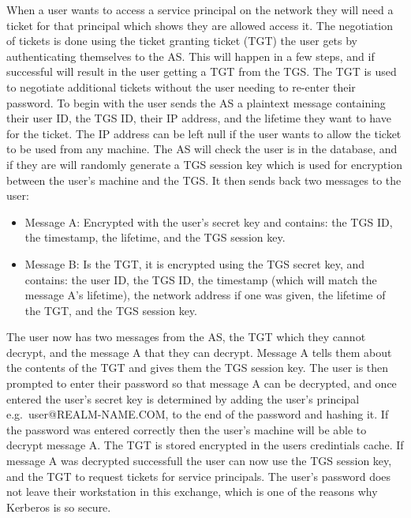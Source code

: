 \documentclass[]{report}   %
\begin{document}
When a user wants to access a service principal on the network they will need a ticket for that principal which shows they are allowed access it. The negotiation of tickets is done using the ticket granting ticket (TGT) the user gets by authenticating themselves to the AS. This will happen in a few steps, and if successful will result in the user getting a TGT from the TGS. The TGT is used to negotiate additional tickets without the user needing to re-enter their password. To begin with the user sends the AS a plaintext message containing their user ID, the TGS ID, their IP address, and the lifetime they want to have for the ticket. The IP address can be left null if the user wants to allow the ticket to be used from any machine. The AS will check the user is in the database, and if they are will randomly generate a TGS session key which is used for encryption between the user's machine and the TGS. It then sends back two messages to the user:
\begin{itemize}
\item Message A: Encrypted with the user's secret key and contains: the TGS ID, the timestamp, the lifetime, and the TGS session key.
\item Message B: Is the TGT, it is encrypted using the TGS secret key, and contains: the user ID, the TGS ID, the timestamp (which will match the message A's lifetime), the network address if one was given, the lifetime of the TGT, and the TGS session key.
\end{itemize}

The user now has two messages from the AS, the TGT which they cannot decrypt, and the message A that they can decrypt. Message A tells them about the contents of the TGT and gives them the TGS session key. The user is then prompted to enter their password so that message A can be decrypted, and once entered the user's secret key is determined by adding the user's principal e.g.\ user@REALM-NAME.COM, to the end of the password and hashing it. If the password was entered correctly then the user's machine will be able to decrypt message A. The TGT is stored encrypted in the users credintials cache. If message A was decrypted successfull the user can now use the TGS session key, and the TGT to request tickets for service principals. The user's password does not leave their workstation in this exchange, which is one of the reasons why Kerberos is so secure.
\end{document}
